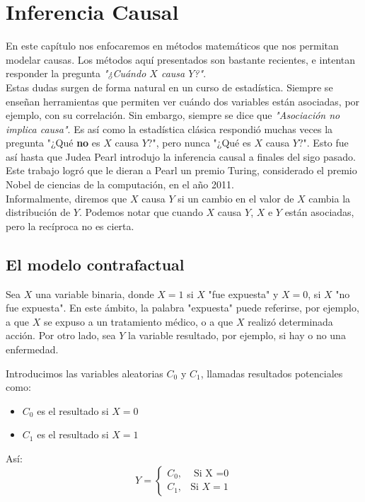 \chapter{Inferencia Causal} 

En este capítulo nos enfocaremos en métodos matemáticos que nos permitan modelar causas. Los métodos aquí presentados son bastante recientes, e intentan responder la pregunta \emph{"¿Cuándo $X$ causa $Y$?"}.\\
Estas dudas surgen de forma natural en un curso de estadística. Siempre se enseñan herramientas que permiten ver cuándo dos variables están asociadas, por ejemplo, con su correlación. Sin embargo, siempre se dice que \emph{"Asociación no implica causa"}. Es así como la estadística clásica respondió muchas veces la pregunta "¿Qué \textbf{no} es $X$ causa $Y$?", pero nunca "¿Qué es $X$ causa $Y$?". Esto fue así hasta que Judea Pearl introdujo la inferencia causal a finales del sigo pasado. Este trabajo logró que le dieran a Pearl un premio Turing, considerado el premio Nobel de ciencias de la computación, en el año 2011. \\
Informalmente, diremos que $X$ causa $Y$ si un cambio en el valor de $X$ cambia la distribución de $Y$. Podemos notar que cuando $X$ causa $Y$, $X$ e $Y$ están asociadas, pero la recíproca no es cierta. 

\section{El modelo contrafactual}

Sea $X$ una variable binaria, donde $X=1$ si $X$ "fue expuesta" y $X=0$, si $X$ "no fue expuesta". En este ámbito, la palabra "expuesta" puede referirse, por ejemplo, a que $X$ se expuso a un tratamiento médico, o a que $X$ realizó determinada acción. Por otro lado, sea $Y$ la variable resultado, por ejemplo, si hay o no una enfermedad. 

 Introducimos las variables aleatorias $C_0$ y $C_1$, llamadas resultados potenciales como: 
\begin{itemize}
    \item $C_0$ es el resultado si $X=0$
    \item $C_1$ es el resultado si $X=1$
\end{itemize}
Así: 
$$
Y=  \begin{cases}
      C_0, &  \text{ Si X =0} \\
		C_1, & \text{Si } X =1
    \end{cases}
$$


